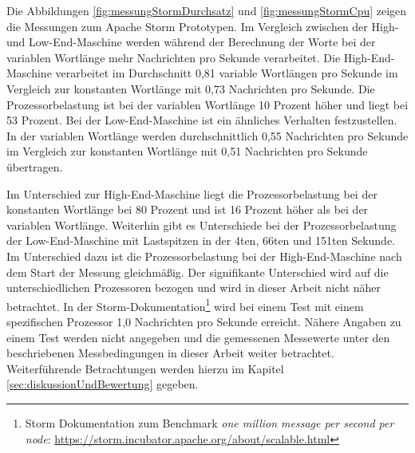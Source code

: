 Die Abbildungen \ref{fig:messungStormDurchsatz} und \ref{fig:messungStormCpu} zeigen die Messungen zum Apache Storm Prototypen. Im Vergleich zwischen der High- und Low-End-Maschine werden während der Berechnung der Worte bei der variablen Wortlänge mehr Nachrichten pro Sekunde verarbeitet. Die High-End-Maschine verarbeitet im Durchschnitt 0,81 variable Wortlängen pro Sekunde im Vergleich zur konstanten Wortlänge mit 0,73 Nachrichten pro Sekunde. Die Prozessorbelastung ist bei der variablen Wortlänge 10 Prozent höher und liegt bei 53 Prozent. Bei der Low-End-Maschine ist ein ähnliches Verhalten festzustellen. In der variablen Wortlänge werden durchschnittlich 0,55 Nachrichten pro Sekunde im Vergleich zur konstanten Wortlänge mit 0,51 Nachrichten pro Sekunde übertragen. 

Im Unterschied zur High-End-Maschine liegt die Prozessorbelastung bei der konstanten Wortlänge bei 80 Prozent und ist 16 Prozent höher als bei der variablen Wortlänge. Weiterhin gibt es Unterschiede bei der Prozessorbelastung der Low-End-Maschine mit Lastspitzen in der 4ten, 66ten und 151ten Sekunde. Im Unterschied dazu ist die Prozessorbelastung bei der High-End-Maschine nach dem Start der Messung gleichmäßig. Der signifikante Unterschied wird auf die unterschiedlichen Prozessoren bezogen und wird in dieser Arbeit nicht näher betrachtet. In der Storm-Dokumentation\footnote{Storm Dokumentation zum Benchmark \textit{one million message per second per node}: \url{https://storm.incubator.apache.org/about/scalable.html}} wird bei einem Test mit einem spezifischen Prozessor 1,0 Nachrichten pro Sekunde erreicht. Nähere Angaben zu einem Test werden nicht angegeben und die gemessenen Messewerte unter den beschriebenen Messbedingungen in dieser Arbeit weiter betrachtet. Weiterführende Betrachtungen werden hierzu im Kapitel \ref{sec:diskussionUndBewertung} gegeben.


